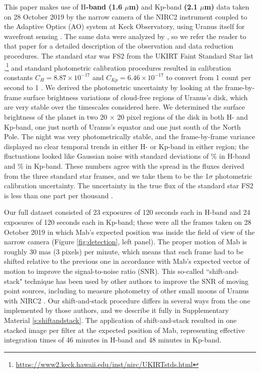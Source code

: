 \documentclass[preprint]{aastex631}
\begin{document}
This paper makes use of H\textbf{-band (1.6 $\mu$m)} and Kp-band \textbf{(2.1 $\mu$m)} data taken on 28 October 2019 by the narrow camera of the NIRC2 instrument coupled to the Adaptive Optics (AO) system at Keck Observatory, using Uranus itself for wavefront sensing \citep{wizinowich00, vandam04}. The same data were analyzed by \citet{paradis23}, so we refer the reader to that paper for a detailed description of the observation and data reduction procedures. The standard star was FS2 from the UKIRT Faint Standard Star list \citep{hawarden01},\footnote{\url{https://www2.keck.hawaii.edu/inst/nirc/UKIRTstds.html}} and standard photometric calibration procedures resulted in calibration constants $C_H = 8.87\times10^{-17}$ and $C_{Kp} = 6.46\times10^{-17}$ to convert from 1 count per second to 1 \ergsec{}. We derived the photometric uncertainty by looking at the frame-by-frame surface brightness variations of cloud-free regions of Uranus's disk, which are very stable over the timescales considered here. We determined the surface brightness of the planet in two 20 $\times$ 20 pixel regions of the disk in both H- and Kp-band, one just north of Uranus's equator and one just south of the North Pole. The night was very photometrically stable, and the frame-by-frame variance displayed no clear temporal trends in either H- or Kp-band in either region; the fluctuations looked like Gaussian noise with standard deviations of 
\% in H-band and \% in Kp-band. These numbers agree with the spread in the fluxes derived from the three standard star frames, and we take them to be the 1$\sigma$ photometric calibration uncertainty. The uncertainty in the true flux of the standard star FS2 is less than one part per thousand \citep{hawarden01}.

Our full dataset consisted of 23 exposures of 120 seconds each in H-band and 24 exposures of 120 seconds each in Kp-band; these were all the frames taken on 28 October 2019 in which Mab's expected position was inside the field of view of the narrow camera (Figure \ref{fig:detection}, left panel).
The proper motion of Mab is roughly 30 mas (3 pixels) per minute, which means that each frame had to be shifted relative to the previous one in accordance with Mab's expected vector of motion to improve the signal-to-noise ratio (SNR). This so-called ``shift-and-stack" technique has been used by other authors to improve the SNR of moving point sources, including to measure photometry of other small moons of Uranus with NIRC2 \citep[][]{paradis19, paradis23}. Our shift-and-stack procedure differs in several ways from the one implemented by those authors, and we describe it fully in Supplementary Material \ref{s:shiftandstack}. The application of shift-and-stack resulted in one stacked image per filter at the expected position of Mab, representing effective integration times of 46 minutes in H-band and 48 minutes in Kp-band.
\end{document}
